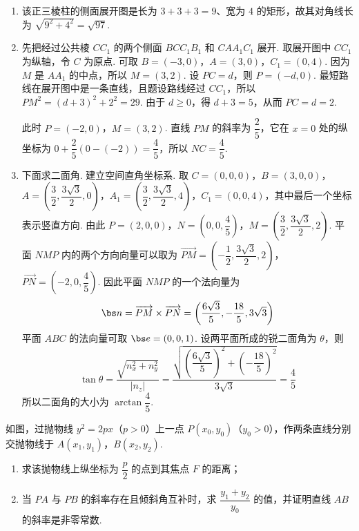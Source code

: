 \begin{solution}
\begin{enumerate}
\item
该正三棱柱的侧面展开图是长为 \(3+3+3=9\)、宽为 \(4\) 的矩形，故其对角线长为
\(\sqrt{9^2+4^2}=\sqrt{97}\).

\item
先把经过公共棱 \(CC_1\) 的两个侧面 \(BCC_1B_1\) 和 \(CAA_1C_1\) 展开. 取展开图中 \(CC_1\) 为纵轴，令 \(C\) 为原点.
可取 \(B=(-3,0)\)，\(A=(3,0)\)，\(C_1=(0,4)\).
因为 \(M\) 是 \(AA_1\) 的中点，所以 \(M=(3,2)\). 设 \(PC=d\)，则 \(P=(-d,0)\). 最短路线在展开图中是一条直线，且题设路线经过 \(CC_1\)，所以 \(PM^2=(d+3)^2+2^2=29\). 由于 \(d\geqslant0\)，得 \(d+3=5\)，从而 \(PC=d=2\).

此时 \(P=(-2,0)\)，\(M=(3,2)\). 直线 \(PM\) 的斜率为 \(\dfrac25\)，它在 \(x=0\) 处的纵坐标为
\(0+\dfrac25(0-(-2))=\dfrac45\)，所以 \(NC=\dfrac45\).

\item
下面求二面角. 建立空间直角坐标系.
取 \(C=(0,0,0)\)，\(B=(3,0,0)\)，\(A=\left(\dfrac32,\dfrac{3\sqrt3}{2},0\right)\)，\(A_1=\left(\dfrac32,\dfrac{3\sqrt3}{2},4\right)\)，\(C_1=(0,0,4)\)，其中最后一个坐标表示竖直方向.
由此 \(P=(2,0,0)\)，\(N=\left(0,0,\dfrac45\right)\)，\(M=\left(\dfrac32,\dfrac{3\sqrt3}{2},2\right)\).
平面 \(NMP\) 内的两个方向向量可以取为 \(\overrightarrow{PM}=\left(-\dfrac12,\dfrac{3\sqrt3}{2},2\right)\)，\(\overrightarrow{PN}=\left(-2,0,\dfrac45\right)\).
因此平面 \(NMP\) 的一个法向量为
\[
\bs n=\overrightarrow{PM}\times\overrightarrow{PN}
=\left(\dfrac{6\sqrt3}{5},-\dfrac{18}{5},3\sqrt3\right)
\]
平面 \(ABC\) 的法向量可取 \(\bs e=(0,0,1)\). 设两平面所成的锐二面角为 \(\theta\)，则
\[
\tan\theta
=\frac{\sqrt{n_x^2+n_y^2}}{|n_z|}
=\frac{\sqrt{\left(\dfrac{6\sqrt3}{5}\right)^2+\left(-\dfrac{18}{5}\right)^2}}{3\sqrt3}
=\dfrac45
\]
所以二面角的大小为 \(\arctan\dfrac45\).
\end{enumerate}
\end{solution}

\begin{problem}
如图，过抛物线 \(y^2=2px\)（\(p>0\)）上一点 \(P(x_0,y_0)\)（\(y_0>0\)），作两条直线分别交抛物线于 \(A(x_1,y_1)\)，\(B(x_2,y_2)\).

\begin{enumerate}
\item 求该抛物线上纵坐标为 \(\dfrac{p}{2}\) 的点到其焦点 \(F\) 的距离；
\item 当 \(PA\) 与 \(PB\) 的斜率存在且倾斜角互补时，求 \(\dfrac{y_1+y_2}{y_0}\) 的值，并证明直线 \(AB\) 的斜率是非零常数.
\end{enumerate}

\end{problem}

